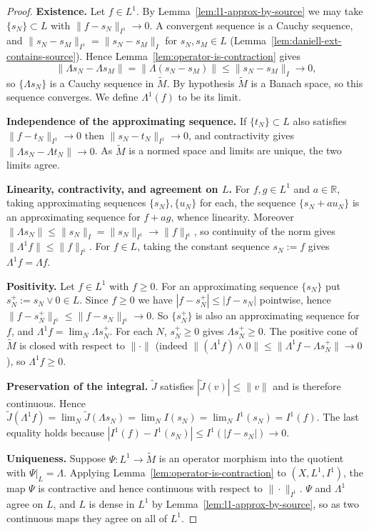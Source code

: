 \begin{proof}
  \textbf{Existence.}
  Let $f\in L^1$. By Lemma~\ref{lem:l1-approx-by-source} we may take
  $\{s_N\}\subset L$ with $\|f-s_N\|_{I^1}\to0$.
  A convergent sequence is a Cauchy sequence, and
  $\|s_N-s_M\|_{I^1}=\|s_N-s_M\|_I$ for $s_N,s_M\in L$
  (Lemma~\ref{lem:daniell-ext-contains-source}).
  Hence Lemma~\ref{lem:operator-is-contraction} gives
  \[
    \|\Lambda s_N-\Lambda s_M\|
    =\|\Lambda(s_N-s_M)\|
    \le\|s_N-s_M\|_I
    \longrightarrow0 ,
  \]
  so $\{\Lambda s_N\}$ is a Cauchy sequence in $\widetilde{M}$.
  By hypothesis $\widetilde{M}$ is a Banach space, so this sequence converges.
  We define $\Lambda^1(f)$ to be its limit.

  \textbf{Independence of the approximating sequence.}
  If $\{t_N\}\subset L$ also satisfies $\|f-t_N\|_{I^1}\to0$ then
  $\|s_N-t_N\|_{I^1}\to0$, and contractivity gives
  $\|\Lambda s_N-\Lambda t_N\|\to0$.
  As $\widetilde{M}$ is a normed space and limits are unique, the two limits
  agree.

  \textbf{Linearity, contractivity, and agreement on $L$.}
  For $f,g\in L^1$ and $a\in\mathbb{R}$, taking approximating sequences
  $\{s_N\},\{u_N\}$ for each, the sequence $\{s_N+au_N\}$ is an approximating
  sequence for $f+ag$, whence linearity.
  Moreover $\|\Lambda s_N\|\le\|s_N\|_I=\|s_N\|_{I^1}\to\|f\|_{I^1}$, so
  continuity of the norm gives $\|\Lambda^1 f\|\le\|f\|_{I^1}$.
  For $f\in L$, taking the constant sequence $s_N:=f$ gives
  $\Lambda^1 f=\Lambda f$.

  \textbf{Positivity.}
  Let $f\in L^1$ with $f\ge0$.
  For an approximating sequence $\{s_N\}$ put $s_N^+:=s_N\vee0\in L$.
  Since $f\ge0$ we have $|f-s_N^+|\le|f-s_N|$ pointwise, hence
  $\|f-s_N^+\|_{I^1}\le\|f-s_N\|_{I^1}\to0$.
  So $\{s_N^+\}$ is also an approximating sequence for $f$, and
  $\Lambda^1 f=\lim_N\Lambda s_N^+$.
  For each $N$, $s_N^+\ge0$ gives $\Lambda s_N^+\ge0$.
  The positive cone of $\widetilde{M}$ is closed with respect to $\|\cdot\|$
  (indeed $\|(\Lambda^1 f)\wedge0\|\le\|\Lambda^1 f-\Lambda s_N^+\|\to0$), so
  $\Lambda^1 f\ge0$.

  \textbf{Preservation of the integral.}
  $\widetilde{J}$ satisfies $|\widetilde{J}(v)|\le\|v\|$ and is therefore
  continuous.
  Hence $\widetilde{J}(\Lambda^1 f)=\lim_N\widetilde{J}(\Lambda s_N)
  =\lim_N I(s_N)=\lim_N I^1(s_N)=I^1(f)$.
  The last equality holds because
  $|I^1(f)-I^1(s_N)|\le I^1(|f-s_N|)\to0$.

  \textbf{Uniqueness.}
  Suppose $\Psi:L^1\to\widetilde{M}$ is an operator morphism into the quotient
  with $\Psi|_L=\Lambda$.
  Applying Lemma~\ref{lem:operator-is-contraction} to $(X,L^1,I^1)$, the map
  $\Psi$ is contractive and hence continuous with respect to
  $\|\cdot\|_{I^1}$.
  $\Psi$ and $\Lambda^1$ agree on $L$, and $L$ is dense in $L^1$ by
  Lemma~\ref{lem:l1-approx-by-source}, so as two continuous maps they agree on
  all of $L^1$.
\end{proof}

